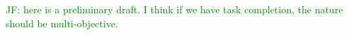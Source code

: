\documentclass[letterpaper, 11 pt, onecolumn]{article}
\newcommand{\jie}[1]{\textcolor{green}{JF: #1}}
\begin{document}



\jie{here is a preliminary draft. I think if we have task completion, the nature should be multi-objective.}
\end{document}
